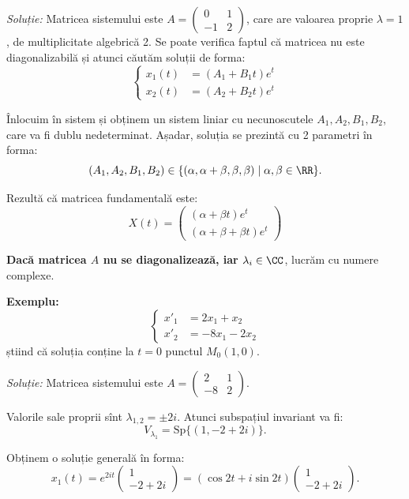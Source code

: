 \emph{Soluție:} Matricea sistemului este $A = \begin{pmatrix} 0 & 1 \\ -1 & 2 \end{pmatrix}$,
care are valoarea proprie $\lambda = 1$, de multiplicitate algebrică 2. Se poate verifica faptul
că matricea nu este diagonalizabilă și atunci căutăm soluții de forma:
\[
  \begin{cases}
    x_1(t) &= (A_1 + B_1 t) e^t \\
    x_2(t) &= (A_2 + B_2 t) e^t
  \end{cases}
\]

Înlocuim în sistem și obținem un sistem liniar cu necunoscutele $A_1, A_2, B_1, B_2$,
care va fi dublu nedeterminat. Așadar, soluția se prezintă cu 2 parametri în forma:
\[
  (A_1, A_2, B_1, B_2) \in \{ (\alpha, \alpha + \beta, \beta, \beta) \mid \alpha, \beta \in \RR \}.
\]

Rezultă că matricea fundamentală este:
\[
  X(t) = \begin{pmatrix}
    (\alpha + \beta t) e^t \\
    (\alpha + \beta + \beta t) e^t
  \end{pmatrix}
\]

\vspace{1cm}

\textbf{Dacă matricea $A$ nu se diagonalizează, iar $\lambda_i \in \CC$}, lucrăm cu numere complexe.

\textbf{Exemplu:}
\[
  \begin{cases}
    x'_1 &= 2x_1 + x_2 \\
    x'_2 &= -8x_1 - 2x_2
  \end{cases}
\]
știind că soluția conține la $t = 0$ punctul $M_0(1, 0)$.

\emph{Soluție:} Matricea sistemului este $A = \begin{pmatrix} 2 & 1 \\ -8 & 2 \end{pmatrix}$.

Valorile sale proprii sînt $\lambda_{1,2} = \pm 2i$. Atunci subspațiul invariant va fi:
\[
  V_{\lambda_1} = \mathrm{Sp} \{(1, -2 + 2i )\}.
\]

Obținem o soluție generală în forma:
\[
  x_1(t) = e^{2it} \begin{pmatrix} 1 \\ -2 + 2i \end{pmatrix} = %
  (\cos 2t + i \sin 2t) \begin{pmatrix} 1 \\ -2 + 2i \end{pmatrix}.
\]

